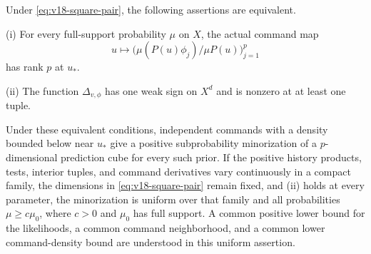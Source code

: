 \begin{theorem}
\label{thm:v18-universal-pairing}
Under \eqref{eq:v18-square-pair}, the following assertions are equivalent.

\smallskip
\noindent\textup{(i)} For every full-support probability $\mu$ on $X$,
the actual command map
\[
 u\longmapsto\bigl(\mu(P(u)\phi_j)/\mu P(u)\bigr)_{j=1}^p
\]
has rank $p$ at $u_*$.

\smallskip
\noindent\textup{(ii)} The function $\Delta_{v,\phi}$ has one weak
sign on $X^d$ and is nonzero at at least one tuple.

\smallskip
Under these equivalent conditions, independent commands with a density
bounded below near $u_*$ give a positive subprobability minorization of
a $p$-dimensional prediction cube for every such prior. If the positive
history products, tests, interior tuples, and command derivatives vary
continuously in a compact family, the dimensions in
\eqref{eq:v18-square-pair} remain fixed, and \textup{(ii)} holds at
every parameter, the minorization is uniform over that family and all
probabilities $\mu\ge c\mu_0$, where $c>0$ and $\mu_0$ has full support.
A common positive lower bound for the likelihoods, a common command
neighborhood, and a common lower command-density bound are understood
in this uniform assertion.
\end{theorem}
